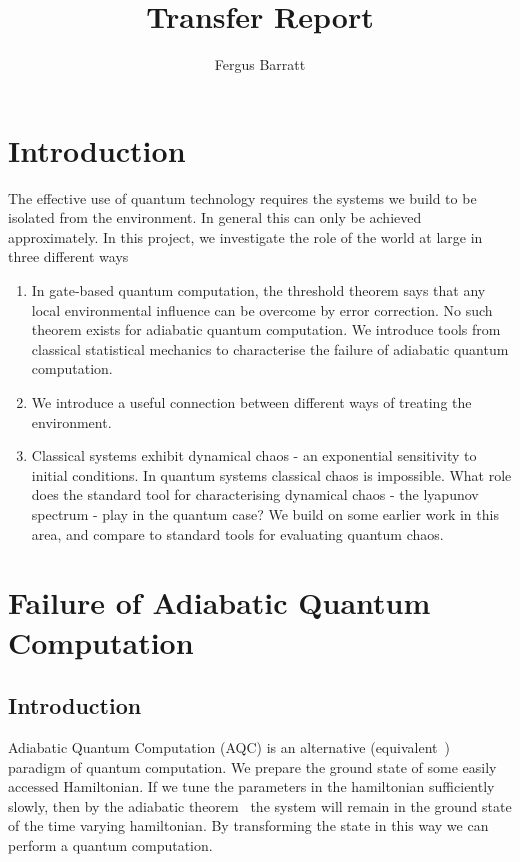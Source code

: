 \documentclass{article}
\title{Transfer Report}
\author{Fergus Barratt}
\begin{document}
\maketitle
\section{Introduction}
The effective use of quantum technology requires the systems we build to be isolated from the environment.
In general this can only be achieved approximately.
In this project, we investigate the role of the world at large in three different ways
\begin{enumerate}
    \item In gate-based quantum computation, the threshold theorem says that any local environmental influence can be overcome by error correction.
          No such theorem exists for adiabatic quantum computation. 
          We introduce tools from classical statistical mechanics to characterise the failure of adiabatic quantum computation.
    \item We introduce a useful connection between different ways of treating the environment.
    \item Classical systems exhibit dynamical chaos - an exponential sensitivity to initial conditions. 
          In quantum systems classical chaos is impossible.
          What role does the standard tool for characterising dynamical chaos - the lyapunov spectrum - play in the quantum case?
          We build on some earlier work in this area, and compare to standard tools for evaluating quantum chaos.
\end{enumerate}
%
\section{Failure of Adiabatic Quantum Computation}\label{sec:failure}
\subsection{Introduction}
%
Adiabatic Quantum Computation (AQC) is an alternative (equivalent~\cite{Aharonov2004}) paradigm of quantum computation.
We prepare the ground state of some easily accessed Hamiltonian.
If we tune the parameters in the hamiltonian sufficiently slowly, then by the adiabatic theorem~\cite{born1928adiabatic} the system will remain in the ground state of the time varying hamiltonian.
By transforming the state in this way we can perform a quantum computation.
\end{document}

